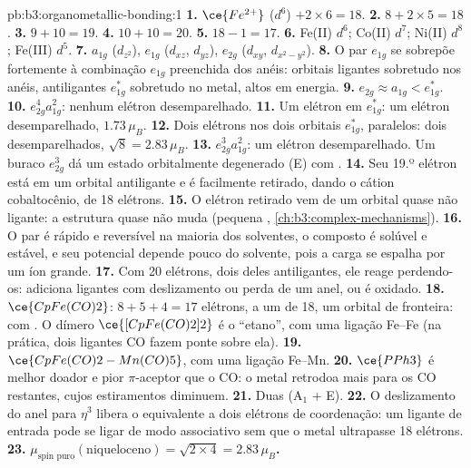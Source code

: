 \begin{solution}{pb:b3:organometallic-bonding:1}
\textbf{1.} $\ce{Fe^{2+}}$ ($d^6$) $+ 2 \times 6 = 18$.
\textbf{2.} $8 + 2 \times 5 = 18$.
\textbf{3.} $9 + 10 = 19$.
\textbf{4.} $10 + 10 = 20$.
\textbf{5.} $18 - 1 = 17$.
\textbf{6.} Fe(II) $d^6$; Co(II) $d^7$; Ni(II) $d^8$; Fe(III) $d^5$.
\textbf{7.} $a_{1g}$ ($d_{z^2}$), $e_{1g}$ ($d_{xz}$, $d_{yz}$), $e_{2g}$ ($d_{xy}$, $d_{x^2-y^2}$).
\textbf{8.} O par $e_{1g}$ se sobrepõe fortemente à combinação $e_{1g}$ preenchida dos anéis: orbitais
ligantes sobretudo nos anéis, antiligantes $e_{1g}^\ast$ sobretudo no metal, altos em
energia.
\textbf{9.} $e_{2g} \approx a_{1g} < e_{1g}^\ast$.
\textbf{10.} $e_{2g}^4a_{1g}^2$: nenhum elétron desemparelhado.
\textbf{11.} Um elétron em $e_{1g}^\ast$: um elétron desemparelhado, $1.73\,\mu_B$.
\textbf{12.} Dois elétrons nos dois orbitais $e_{1g}^\ast$, paralelos: dois desemparelhados, $\sqrt{8} =
2.83\,\mu_B$.
\textbf{13.} $e_{2g}^3a_{1g}^2$: um elétron desemparelhado. Um buraco $e_{2g}^3$ dá um estado orbitalmente degenerado
(E) com .
\textbf{14.} Seu 19.º elétron está em um orbital antiligante e é facilmente retirado,
dando o cátion cobaltocênio, de 18 elétrons.
\textbf{15.} O elétron retirado vem de um orbital quase não ligante: a
estrutura quase não muda (pequena , \cref{ch:b3:complex-mechanisms}).
\textbf{16.} O par é rápido e reversível na maioria dos solventes, o composto é
solúvel e estável, e seu potencial depende pouco do solvente, pois a
carga se espalha por um íon grande.
\textbf{17.} Com 20 elétrons, dois deles antiligantes, ele reage perdendo-os:
adiciona ligantes com deslizamento ou perda de um anel, ou é oxidado.
\textbf{18.} $\ce{CpFe(CO)2}$: $8 + 5 + 4 = 17$ elétrons, a um de 18, um orbital de fronteira: 
com . O dímero $\ce{[CpFe(CO)2]2}$ é o ``etano'', com uma ligação Fe--Fe (na prática, dois ligantes CO
fazem ponte sobre ela).
\textbf{19.} $\ce{CpFe(CO)2-Mn(CO)5}$, com uma ligação Fe--Mn.
\textbf{20.} $\ce{PPh3}$ é melhor doador e pior $\pi$-aceptor que o CO: o metal retrodoa
mais para os CO restantes, cujos estiramentos diminuem.
\textbf{21.} Duas (A$_1$ + E).
\textbf{22.} O deslizamento do anel para $\eta^3$ libera o equivalente a dois elétrons de coordenação: um ligante
de entrada pode se ligar de modo associativo sem que o metal ultrapasse 18 elétrons.
\textbf{23.} \textbf{$\mu_{\text{spin puro}}(\text{niqueloceno}) = \sqrt{2 \times 4} = 2.83\,\mu_B$.}
\end{solution}
